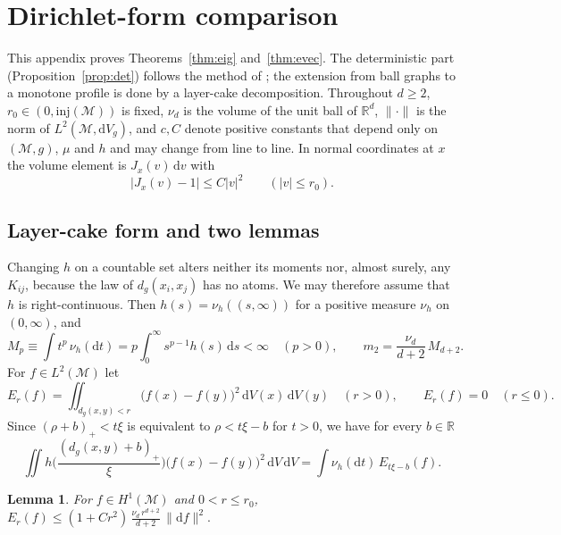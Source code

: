 \documentclass[11pt,a4paper]{article}
\theoremstyle{stmt}
\newtheorem{lemma}[theorem]{Lemma}
\theoremstyle{defn}
\theoremstyle{rmk}
\numberwithin{equation}{section}
\newcommand{\M}{\mathcal{M}}
\newcommand{\R}{\mathbb{R}}
\newcommand{\dd}{\mathrm{d}}
\begin{document}
\section{Dirichlet-form comparison}\label{app:dirichlet}

This appendix proves Theorems~\ref{thm:eig} and~\ref{thm:evec}. The deterministic part (Proposition~\ref{prop:det}) follows the method of \cite{BIK}; the extension from ball graphs to a monotone profile is done by a layer-cake decomposition. Throughout $d\ge2$, $r_0\in(0,\mathrm{inj}(\M))$ is fixed, $\nu_d$ is the volume of the unit ball of $\R^d$, $\|\cdot\|$ is the norm of $L^2(\M,\dd V_g)$, and $c,C$ denote positive constants that depend only on $(\M,g)$, $\mu$ and $h$ and may change from line to line. In normal coordinates at $x$ the volume element is $J_x(v)\,\dd v$ with
\begin{equation}\label{eq:J}
|J_x(v)-1|\le C|v|^2\qquad(|v|\le r_0).
\end{equation}

\subsection{Layer-cake form and two lemmas}

Changing $h$ on a countable set alters neither its moments nor, almost surely, any $K_{ij}$, because the law of $d_g(x_i,x_j)$ has no atoms. We may therefore assume that $h$ is right-continuous. Then $h(s)=\nu_h((s,\infty))$ for a positive measure $\nu_h$ on $(0,\infty)$, and
\begin{equation}\label{eq:moments}
M_p\equiv\int t^p\,\nu_h(\dd t)=p\int_0^\infty s^{p-1}h(s)\,\dd s<\infty\quad(p>0),\qquad m_2=\frac{\nu_d}{d+2}\,M_{d+2}.
\end{equation}
For $f\in L^2(\M)$ let
\begin{equation}
E_r(f)=\iint_{d_g(x,y)<r}\big(f(x)-f(y)\big)^2\,\dd V(x)\,\dd V(y)\quad(r>0),\qquad E_r(f)=0\quad(r\le0).
\end{equation}
Since $(\rho+b)_+<t\xi$ is equivalent to $\rho<t\xi-b$ for $t>0$, we have for every $b\in\R$
\begin{equation}\label{eq:layer}
\iint h\Big(\frac{(d_g(x,y)+b)_+}{\xi}\Big)\big(f(x)-f(y)\big)^2\,\dd V\,\dd V=\int\nu_h(\dd t)\,E_{t\xi-b}(f).
\end{equation}

\begin{lemma}\label{lem:Er}
For $f\in H^1(\M)$ and $0<r\le r_0$,
$\displaystyle E_r(f)\le(1+Cr^2)\,\frac{\nu_d\,r^{d+2}}{d+2}\,\|\dd f\|^2 .$
\end{lemma}
\end{document}
